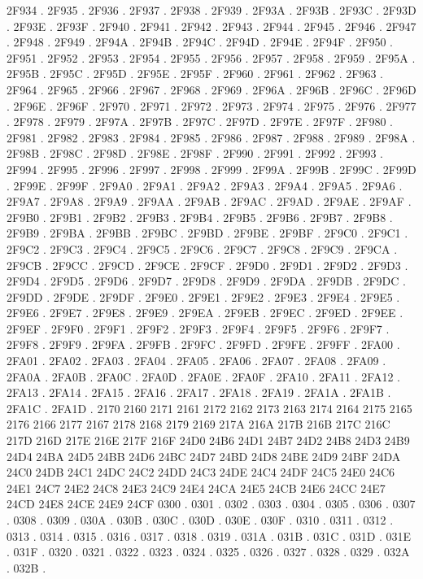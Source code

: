 2F934 .
2F935 .
2F936 .
2F937 .
2F938 .
2F939 .
2F93A .
2F93B .
2F93C .
2F93D .
2F93E .
2F93F .
2F940 .
2F941 .
2F942 .
2F943 .
2F944 .
2F945 .
2F946 .
2F947 .
2F948 .
2F949 .
2F94A .
2F94B .
2F94C .
2F94D .
2F94E .
2F94F .
2F950 .
2F951 .
2F952 .
2F953 .
2F954 .
2F955 .
2F956 .
2F957 .
2F958 .
2F959 .
2F95A .
2F95B .
2F95C .
2F95D .
2F95E .
2F95F .
2F960 .
2F961 .
2F962 .
2F963 .
2F964 .
2F965 .
2F966 .
2F967 .
2F968 .
2F969 .
2F96A .
2F96B .
2F96C .
2F96D .
2F96E .
2F96F .
2F970 .
2F971 .
2F972 .
2F973 .
2F974 .
2F975 .
2F976 .
2F977 .
2F978 .
2F979 .
2F97A .
2F97B .
2F97C .
2F97D .
2F97E .
2F97F .
2F980 .
2F981 .
2F982 .
2F983 .
2F984 .
2F985 .
2F986 .
2F987 .
2F988 .
2F989 .
2F98A .
2F98B .
2F98C .
2F98D .
2F98E .
2F98F .
2F990 .
2F991 .
2F992 .
2F993 .
2F994 .
2F995 .
2F996 .
2F997 .
2F998 .
2F999 .
2F99A .
2F99B .
2F99C .
2F99D .
2F99E .
2F99F .
2F9A0 .
2F9A1 .
2F9A2 .
2F9A3 .
2F9A4 .
2F9A5 .
2F9A6 .
2F9A7 .
2F9A8 .
2F9A9 .
2F9AA .
2F9AB .
2F9AC .
2F9AD .
2F9AE .
2F9AF .
2F9B0 .
2F9B1 .
2F9B2 .
2F9B3 .
2F9B4 .
2F9B5 .
2F9B6 .
2F9B7 .
2F9B8 .
2F9B9 .
2F9BA .
2F9BB .
2F9BC .
2F9BD .
2F9BE .
2F9BF .
2F9C0 .
2F9C1 .
2F9C2 .
2F9C3 .
2F9C4 .
2F9C5 .
2F9C6 .
2F9C7 .
2F9C8 .
2F9C9 .
2F9CA .
2F9CB .
2F9CC .
2F9CD .
2F9CE .
2F9CF .
2F9D0 .
2F9D1 .
2F9D2 .
2F9D3 .
2F9D4 .
2F9D5 .
2F9D6 .
2F9D7 .
2F9D8 .
2F9D9 .
2F9DA .
2F9DB .
2F9DC .
2F9DD .
2F9DE .
2F9DF .
2F9E0 .
2F9E1 .
2F9E2 .
2F9E3 .
2F9E4 .
2F9E5 .
2F9E6 .
2F9E7 .
2F9E8 .
2F9E9 .
2F9EA .
2F9EB .
2F9EC .
2F9ED .
2F9EE .
2F9EF .
2F9F0 .
2F9F1 .
2F9F2 .
2F9F3 .
2F9F4 .
2F9F5 .
2F9F6 .
2F9F7 .
2F9F8 .
2F9F9 .
2F9FA .
2F9FB .
2F9FC .
2F9FD .
2F9FE .
2F9FF .
2FA00 .
2FA01 .
2FA02 .
2FA03 .
2FA04 .
2FA05 .
2FA06 .
2FA07 .
2FA08 .
2FA09 .
2FA0A .
2FA0B .
2FA0C .
2FA0D .
2FA0E .
2FA0F .
2FA10 .
2FA11 .
2FA12 .
2FA13 .
2FA14 .
2FA15 .
2FA16 .
2FA17 .
2FA18 .
2FA19 .
2FA1A .
2FA1B .
2FA1C .
2FA1D .
2170 2160
2171 2161
2172 2162
2173 2163
2174 2164
2175 2165
2176 2166
2177 2167
2178 2168
2179 2169
217A 216A
217B 216B
217C 216C
217D 216D
217E 216E
217F 216F
24D0 24B6
24D1 24B7
24D2 24B8
24D3 24B9
24D4 24BA
24D5 24BB
24D6 24BC
24D7 24BD
24D8 24BE
24D9 24BF
24DA 24C0
24DB 24C1
24DC 24C2
24DD 24C3
24DE 24C4
24DF 24C5
24E0 24C6
24E1 24C7
24E2 24C8
24E3 24C9
24E4 24CA
24E5 24CB
24E6 24CC
24E7 24CD
24E8 24CE
24E9 24CF
0300 .
0301 .
0302 .
0303 .
0304 .
0305 .
0306 .
0307 .
0308 .
0309 .
030A .
030B .
030C .
030D .
030E .
030F .
0310 .
0311 .
0312 .
0313 .
0314 .
0315 .
0316 .
0317 .
0318 .
0319 .
031A .
031B .
031C .
031D .
031E .
031F .
0320 .
0321 .
0322 .
0323 .
0324 .
0325 .
0326 .
0327 .
0328 .
0329 .
032A .
032B .
